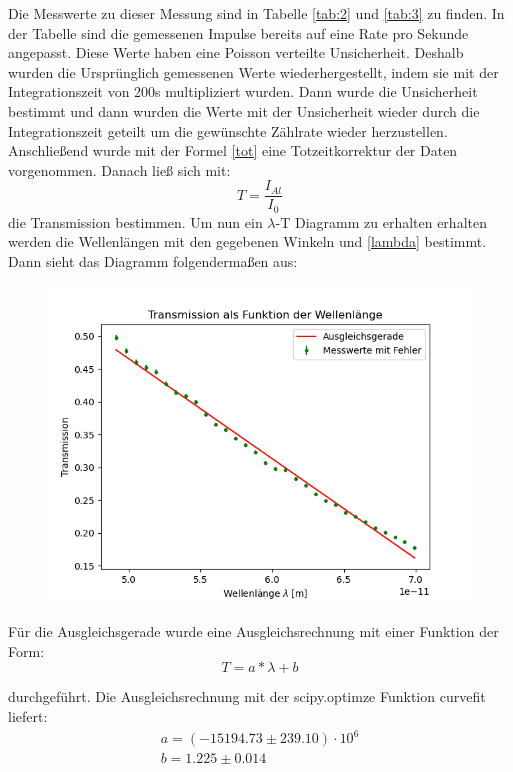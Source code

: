 Die Messwerte zu dieser Messung sind in Tabelle \ref{tab:2} und \ref{tab:3} zu finden. In der Tabelle sind die gemessenen Impulse bereits auf eine Rate pro Sekunde angepasst. Diese Werte haben eine Poisson verteilte Unsicherheit. Deshalb wurden die Ursprünglich gemessenen Werte wiederhergestellt, indem sie mit der Integrationszeit von 200s multipliziert wurden. Dann wurde die Unsicherheit bestimmt und dann wurden die Werte mit der Unsicherheit wieder durch die Integrationszeit geteilt um die gewünschte Zählrate wieder herzustellen.
Anschließend wurde mit der Formel \ref{tot} eine Totzeitkorrektur der Daten vorgenommen. 
Danach ließ sich mit:
\begin{displaymath}
    T=\frac{I_{Al}}{I_0}
\end{displaymath}
\noindent die Transmission bestimmen. Um nun ein $\lambda$-T Diagramm zu erhalten erhalten werden die Wellenlängen mit den gegebenen Winkeln und \ref{lambda} bestimmt.
Dann sieht das Diagramm folgendermaßen aus:
\begin{figure}[H]
    \centering
    \includegraphics{Transmission.png}
\end{figure}

Für die Ausgleichsgerade wurde eine Ausgleichsrechnung mit einer Funktion der Form:
\begin{displaymath}
    T = a * \lambda + b
\end{displaymath}

\noindent durchgeführt. Die Ausgleichsrechnung mit der scipy.optimze Funktion curvefit liefert:
\begin{align}
    a = (-15194.73 \pm 239.10) \cdot 10^6 \nonumber \\
    b = 1.225 \pm 0.014 \nonumber 
\end{align}

